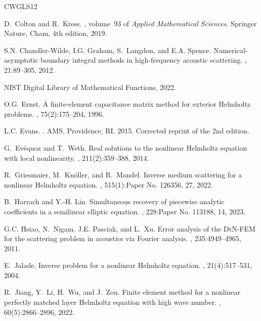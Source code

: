\documentclass[12pt,DIV=14]{scrartcl}
\renewenvironment{thebibliography}[1]{
\begin{oldthebibliography}{#1}
\setlength{\itemsep}{0em}
\setlength{\parskip}{0em}
}
{
\end{oldthebibliography}
}
\begin{document}
\begin{thebibliography}{CWGLS12}
D.~Colton and R.~Kress.
,
  volume~93 of {\em Applied Mathematical Sciences}.
\newblock Springer Nature, Cham, 4th edition, 2019.

S.N. Chandler-Wilde, I.G. Graham, S.~Langdon, and E.A. Spence.
\newblock Numerical-asymptotic boundary integral methods in high-frequency
  acoustic scattering.
, 21:89--305, 2012.

{NIST} {D}igital {L}ibrary of {M}athematical {F}unctions, 2022.

O.G. Ernst.
\newblock A finite-element capacitance matrix method for exterior {H}elmholtz
  problems.
, 75(2):175--204, 1996.

L.C. Evans.
.
\newblock AMS, Providence, RI, 2015.
\newblock Corrected reprint of the 2nd edition.

G.~Ev\'{e}quoz and T.~Weth.
\newblock Real solutions to the nonlinear {H}elmholtz equation with local
  nonlinearity.
, 211(2):359--388, 2014.

R.~Griesmaier, M.~Kn\"{o}ller, and R.~Mandel.
\newblock Inverse medium scattering for a nonlinear {H}elmholtz equation.
, 515(1):Paper No. 126356, 27, 2022.

B.~Harrach and Y.-H. Lin.
\newblock Simultaneous recovery of piecewise analytic coefficients in a
  semilinear elliptic equation.
, 228:Paper No. 113188, 14, 2023.

G.C. Hsiao, N.~Nigam, J.E. Pasciak, and L.~Xu.
\newblock Error analysis of the {DtN}-{FEM} for the scattering problem in
  acoustics via {F}ourier analysis.
, 235:4949--4965, 2011.

E.~Jalade.
\newblock Inverse problem for a nonlinear {H}elmholtz equation.
,
  21(4):517--531, 2004.

R.~Jiang, Y.~Li, H.~Wu, and J.~Zou.
\newblock Finite element method for a nonlinear perfectly matched layer
  {H}elmholtz equation with high wave number.
, 60(5):2866--2896, 2022.


\end{thebibliography}
\end{document}
